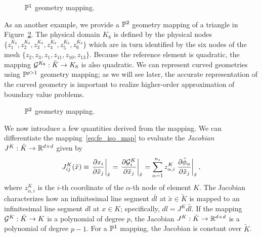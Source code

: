 \begin{figure}
  \centering
  \caption{$\mathbb{P}^1$ geometry mapping. \label{fig:fe_impl_isomap_p1}}
\end{figure}

As an another example, we provide a $\mathbb{P}^2$ geometry mapping of a triangle in Figure~\ref{fig:fe_impl_isomap_p2}. The physical domain $K_8$ is defined by the physical nodes $\{ z_1^{K_8}, z_2^{K_8}, z_3^{K_8}, z_4^{K_8}, z_5^{K_8}, z_6^{K_8} \}$ which are in turn identified by the six nodes of the mesh $\{ z_2, z_3, z_1, z_{11}, z_{10}, z_{13} \}$.  Because the reference element is quadratic, the mapping $\mathcal{G}^{K_8}: \tilde K \to K_8$ is also quadratic.  We can represent curved geometries using $\mathbb{P}^{p>1}$ geometry mapping; as we will see later, the accurate representation of the curved geometry is important to realize higher-order approximation of boundary value problems. 

\begin{figure}
  \centering
  \caption{$\mathbb{P}^2$ geometry mapping. \label{fig:fe_impl_isomap_p2}}
\end{figure}

We now introduce a few quantities derived from the mapping.  We can differentiate the mapping~\eqref{eq:fe_iso_map} to evaluate the \emph{Jacobian} $J^K: \tilde K \to \mathbb{R}^{d \times d}$ given by
\begin{equation*}
  J^K_{ij}(\tilde x)
  \equiv \left. \frac{\partial x_i}{\partial \tilde x_j} \right|_{\tilde x}
  = \left. \frac{\partial \mathcal{G}^K_i}{\partial \tilde x_j} \right|_{\tilde x}
  = \sum_{\alpha= 1}^{n_s} z^K_{\alpha,i} \left. \frac{\partial \tilde \phi_\alpha}{\partial \tilde x_j} \right|_{\tilde x},
\end{equation*}
where $z^K_{\alpha,i}$ is the $i$-th coordinate of the $\alpha$-th node of element $K$. The Jacobian characterizes how an infinitesimal line segment $d\tilde l$ at $\tilde x \in \tilde K$ is mapped to an infinitesimal line segment $dl$ at $x \in K$; specifically, $dl = J^K d\tilde l$.  If the mapping $\mathcal{G}^K: \tilde K \to K$ is a polynomial of degree $p$, the Jacobian $J^K: \tilde K \to \mathbb{R}^{d \times d}$ is a polynomial of degree $p-1$. For a $\mathbb{P}^1$ mapping, the Jacobian is constant over $\tilde K$.

